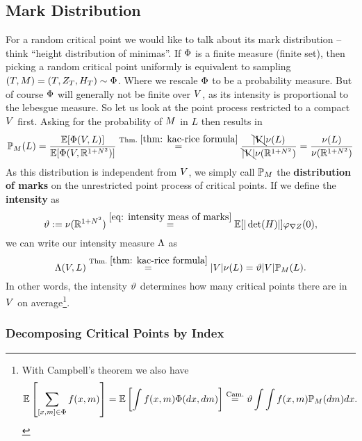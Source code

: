 \subsection{Mark Distribution}

For a random critical point we would like to talk about its mark
distribution -- think ``height distribution of minimas''. If \(\Phi\) is a finite measure (finite set), then picking a random
critical point uniformly is equivalent to sampling
\((T,M)=(T,Z_T,H_T)\sim\Phi\).  Where we rescale \(\Phi\) to be a
probability measure. But of course \(\Phi\) will generally not be finite over
\(V\), as its intensity is proportional to the lebesgue measure. So let us
look at the point process restricted to a compact \(V\) first. Asking for the
probability of \(M\) in \(L\) then results in
\[
	\mathbb{P}_M(L)
	=\frac{\mathbb{E}[\Phi(V, L)]}{\mathbb{E}[\Phi(V, \mathbb{R}^{1+N^2})]}
	\overset{\text{Thm.~}\ref{thm: kac-rice formula}}=
	\frac{\bcancel{|V|}\nu(L)}{\bcancel{|V|}\nu(\mathbb{R}^{1+N^2})}
	= \frac{\nu(L)}{\nu(\mathbb{R}^{1+N^2})}
\]
As this distribution is independent from \(V\), we simply call
\(\mathbb{P}_M\) the \textbf{distribution of marks} on the unrestricted point
process of critical points.  If we define the
\textbf{intensity} as
\[
	\vartheta
	:= \nu(\mathbb{R}^{1+N^2})
	\overset{\eqref{eq: intensity meas of marks}}=
	\mathbb{E}[|\det(H)|]\varphi_{\nabla Z}(0),
\]
we can write our intensity measure \(\Lambda\) as
\[
	\Lambda(V, L) 
	\overset{\text{Thm.~}\ref{thm: kac-rice formula}}=
	|V|\nu(L)
	= \vartheta |V| \mathbb{P}_M(L).
\]
In other words, the intensity \(\vartheta\) determines how many critical points
there are in \(V\) on average\footnote{
	With Campbell's theorem we also have
	\[
		\mathbb{E}\left[\sum_{[x,m]\in\Phi} f(x,m)\right]
		=\mathbb{E}\left[\int f(x,m) \Phi(dx,dm)\right]
		\overset{\text{Cam.}}= \vartheta \int \int f(x,m) \mathbb{P}_M(dm) dx.
	\]
}.

\subsubsection{Decomposing Critical Points by Index}

